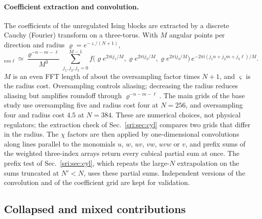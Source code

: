 \paragraph{Coefficient extraction and convolution.} The coefficients of the unregulated Ising blocks are extracted by
a discrete Cauchy (Fourier) transform on a three-torus. With $M$ angular points per direction and radius
$\varrho=e^{-\varsigma/(N+1)}$,
\begin{equation}
 [f]_{nm\ell}\simeq\frac{\varrho^{-n-m-\ell}}{M^3}\sum_{j_1,j_2,j_3=0}^{M-1}
 f\bigl(\varrho e^{2\pi\mathrm ij_1/M},\varrho e^{2\pi\mathrm ij_2/M},\varrho e^{2\pi\mathrm ij_3/M}\bigr)\,
 e^{-2\pi\mathrm i(j_1n+j_2m+j_3\ell)/M}.
\end{equation}
$M$ is an even FFT length of about the oversampling factor times $N+1$, and $\varsigma$ is the radius cost.
Oversampling controls aliasing; decreasing the radius reduces aliasing but amplifies roundoff through
$\varrho^{-n-m-\ell}$. The main grids of the base study use oversampling five and radius cost four at $N=256$, and
oversampling four and radius cost $4.5$ at $N=384$. These are numerical choices, not physical regulators; the
extraction check of Sec.~\ref{sri:sec:cyl} compares two grids that differ in the radius. The $\chi$ factors are then
applied by one-dimensional convolutions along lines parallel to the monomials $u$, $w$, $uv$, $vw$, $uvw$ or $v$, and
prefix sums of the weighted three-index arrays return every cubical partial sum at once. The prefix test of
Sec.~\ref{sri:sec:cyl}, which repeats the large-$N$ extrapolation on the sums truncated at $N'<N$, uses these partial sums.
Independent versions of the convolution and of the coefficient grid are kept for validation.

\subsection{Collapsed and mixed contributions}\label{sri:app:cyl:collapsed}
